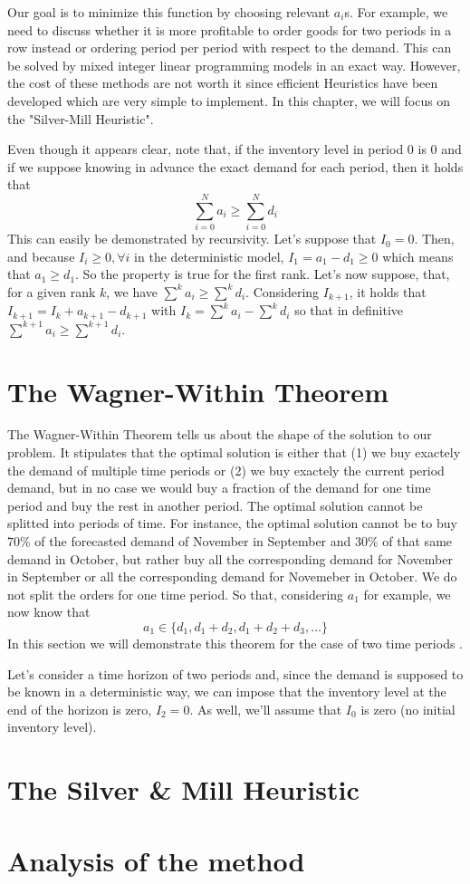 Our goal is to minimize this function by choosing relevant $a_i$s. For example, we need to discuss whether it is more profitable to order goods for two periods in a row instead or ordering period per period with respect to the demand. This can be solved by mixed integer linear programming models in an exact way. However, the cost of these methods are not worth it since efficient Heuristics have been developed which are very simple to implement. In this chapter, we will focus on the "Silver-Mill Heuristic". 

Even though it appears clear, note that, if the inventory level in period $0$ is $0$ and if we suppose knowing in advance the exact demand for each period, then it holds that \[ \sum_{i=0}^N a_i \ge \sum_{i=0}^Nd_i \]This can easily be demonstrated by recursivity. Let's suppose that $I_0=0$. Then, and because $I_i\ge 0, \forall i$ in the deterministic model, $I_1=a_1-d_1\ge 0$ which means that $a_1\ge d_1$. So the property is true for the first rank. Let's now suppose, that, for a given rank $k$, we have $\sum^k a_i\ge \sum^k d_i$. Considering $I_{k+1}$, it holds that $I_{k+1} = I_k + a_{k+1} - d_{k+1}$ with $I_k = \sum^k a_i - \sum^k d_i$ so that in definitive $\sum^{k+1}a_i\ge\sum^{k+1}d_i$.

\section{The Wagner-Within Theorem}

The Wagner-Within Theorem tells us about the shape of the solution to our problem. It stipulates that the optimal solution is either that (1) we buy exactely the demand of multiple time periods or (2) we buy exactely the current period demand, but in no case we would buy a fraction of the demand for one time period and buy the rest in another period. The optimal solution cannot be splitted into periods of time. For instance, the optimal solution cannot be to buy 70\% of the forecasted demand of November in September and 30\% of that same demand in October, but rather buy all the corresponding demand for November in September or all the corresponding demand for Novemeber in October. We do not split the orders for one time period. So that, considering $a_1$ for example, we now know that \[ a_1 \in \{ d_1, d_1+d_2, d_1+d_2+d_3, \hdots \} \] In this section we will demonstrate this theorem for the case of two time periods \WLOG. 

Let's consider a time horizon of two periods and, since the demand is supposed to be known in a deterministic way, we can impose that the inventory level at the end of the horizon is zero, $I_2=0$. As well, we'll assume that $I_0$ is zero (no initial inventory level). 

\section{The Silver \& Mill Heuristic}

\section{Analysis of the method}
